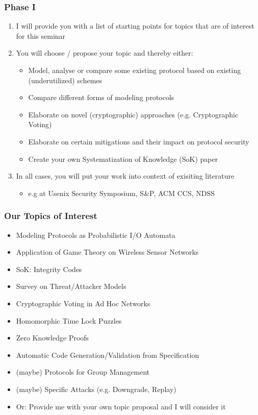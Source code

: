 \documentclass[xcolor={usenames,dvipsnames}]{beamer}
\begin{document}
\begin{frame}
	\frametitle{Phase \alert{I}}
	\begin{enumerate}
		\item I will provide you with a list of starting points for topics that are of interest for this seminar
		\item You will \alert{choose / propose} your topic and thereby either:
			\begin{itemize}
				\item Model, analyse or compare some existing protocol based on existing (underutilized) schemes
				\item Compare different forms of modeling protocols
				\item Elaborate on novel (cryptographic) approaches (e.g. Cryptographic Voting)
				\item Elaborate on certain mitigations and their impact on protocol security
				\item Create your own Systematization of Knowledge (SoK) paper
			\end{itemize}
		\item In all cases, you will put your work into context of exisiting literature
			\begin{itemize}
				\item e.g at Usenix Security Symposium, S\&P, ACM CCS, NDSS
			\end{itemize}
	\end{enumerate}
\end{frame}

\begin{frame}
	\frametitle{Our Topics of Interest}
	\begin{itemize}
		\item Modeling Protocols as Probabilistic I/O Automata
		\item Application of Game Theory on Wireless Sensor Networks
		\item SoK: Integrity Codes
		\item Survey on Threat/Attacker Models
		\item Cryptographic Voting in Ad Hoc Networks
		\item Homomorphic Time Lock Puzzles
		\item Zero Knowledge Proofs
		\item Automatic Code Generation/Validation from Specification
		\item (maybe) Protocols for Group Management
		\item (maybe) Specific Attacks (e.g. Downgrade, Replay) %
		\item \alert{Or:} Provide me with your own topic proposal and I will consider it
	\end{itemize}
\end{frame}
\end{document}
